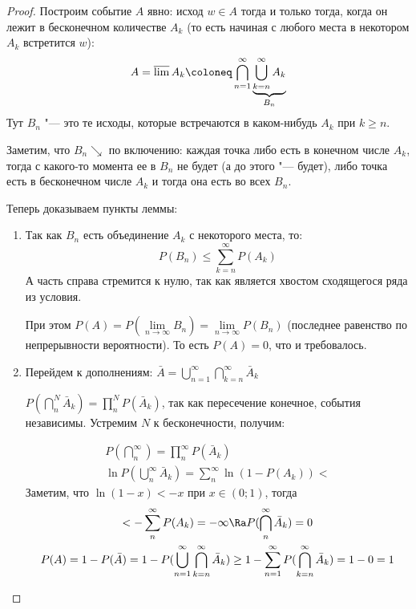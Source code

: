 \begin{proof}
    Построим событие $A$ явно: исход $w \in A$ тогда и только тогда,
    когда он лежит в бесконечном количестве $A_k$ (то есть начиная с любого места в некотором $A_k$ встретится $w$):
    \[ A = \varlimsup A_k \coloneq \bigcap\limits_{n=1}^{\infty} \underbrace{\bigcup\limits_{k=n}^{\infty} A_k}_{B_n} \]
    Тут $B_n$ "--- это те исходы, которые встречаются в каком-нибудь $A_{k}$ при $k \ge n$.

    Заметим, что $B_n \searrow$ по включению: каждая точка либо есть в конечном числе $A_k$, тогда с какого-то момента ее в $B_n$ не будет (а до этого "--- будет), либо точка есть в бесконечном числе $A_k$ и тогда она есть во всех $B_n$.

    Теперь доказываем пункты леммы:
    \begin{enumerate}
    \item
        Так как $B_n$ есть объединение $A_k$ с некоторого места, то:
        \[ P(B_n) \leq \sum\limits_{k=n}^{\infty} P(A_k) \]
        А часть справа стремится к нулю, так как является хвостом сходящегося ряда из условия.

        При этом $P(A) = P\left(\lim\limits_{n \to \infty} B_n\right) = \lim\limits_{n \to \infty} P(B_n)$ (последнее равенство по непрерывности вероятности).
        То есть $P(A) = 0$, что и требовалось. 

    \item
    Перейдем к дополнениям: $\bar A = \bigcup\limits_{n=1}^{\infty} \bigcap\limits_{k=n}^{\infty} \bar A_k$

    $P(\bigcap\limits_n^N \bar A_k) = \prod\limits_n^N P(\bar A_k)$, так как пересечение конечное, события независимы.
    Устремим $N$ к бесконечности, получим:

    \begin{gather*} 
    P(\bigcap\limits_n^{\infty}) = \prod\limits_n^{\infty} P(\bar A_k)\\
    \ln P(\bigcup\limits_n^{\infty} \bar A_k) = \sum\limits_n^{\infty} \ln(1 - P(A_k)) < 
    \end{gather*}     
    Заметим, что $\ln(1 - x) < -x$ при $x \in (0; 1)$, тогда
    \begin{gather*} 
     < -\sum\limits_n^{\infty} P(A_k) = -\infty \Ra P(\bigcap\limits_n^{\infty} \bar A_k) = 0 \\
    P(A) = 1 - P(\bar A) = 1 - P(\bigcup\limits_{n=1}^{\infty} \bigcap\limits_{k=n}^{\infty} \bar A_k) \geq 1 - \sum\limits_{n=1}^{\infty} P(\bigcap\limits_{k=n}^{\infty} \bar A_k) = 1 - 0 = 1
    \end{gather*} 
                                                                                     
    \end{enumerate}
\end{proof}

